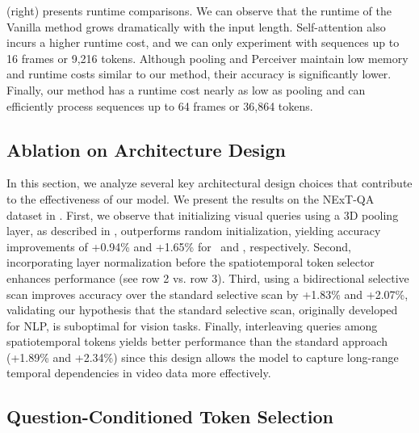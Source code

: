  (right) presents runtime comparisons. We can observe that the runtime of the Vanilla method grows dramatically with the input length. Self-attention also incurs a higher runtime cost, and we can only experiment with sequences up to 16 frames or 9,216 tokens. Although pooling and Perceiver maintain low memory and runtime costs similar to our method, their accuracy is significantly lower. Finally, our method has a runtime cost nearly as low as pooling and can efficiently process sequences up to 64 frames or 36,864 tokens. 

\subsection{Ablation on Architecture Design}
\label{sec:architecture}



In this section, we analyze several key architectural design choices that contribute to the effectiveness of our model. We present the results on the NExT-QA dataset in . First, we observe that initializing visual queries using a 3D pooling layer, as described in , outperforms random initialization, yielding accuracy improvements of +0.94\% and +1.65\% for \modelLlava\ and \modelLlama, respectively. Second, incorporating layer normalization before the spatiotemporal token selector enhances performance (see row 2 vs. row 3). Third, using a bidirectional selective scan improves accuracy over the standard selective scan by +1.83\% and +2.07\%, validating our hypothesis that the standard selective scan, originally developed for NLP, is suboptimal for vision tasks. %
Finally, interleaving queries among spatiotemporal tokens yields better performance than the standard approach (+1.89\% and +2.34\%) since this design allows the model to capture long-range temporal dependencies in video data more effectively.



\subsection{Question-Conditioned Token Selection}
\label{sec:question condition}




